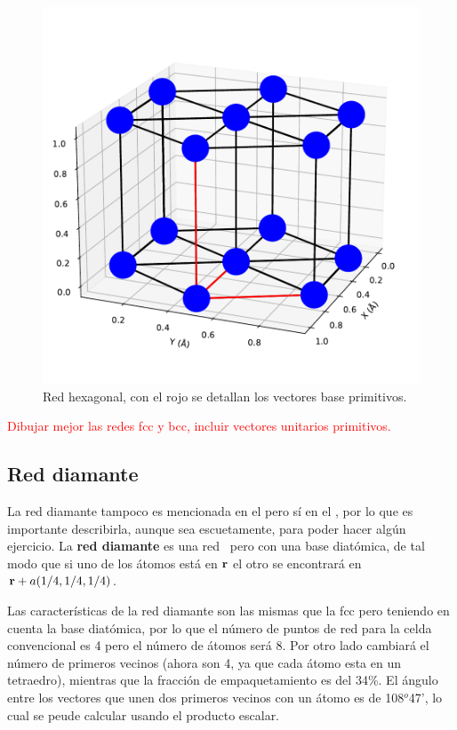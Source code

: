 \begin{figure}[h!] \centering
	\includegraphics[scale=0.4]{Imagenes/1.pdf}
	\caption{Red hexagonal, con el rojo se detallan los vectores base primitivos.}
	\label{Fig:01-051}
\end{figure}

\begin{Anotacion}
	\textcolor{red}{
	Dibujar mejor las redes fcc y bcc, incluir vectores unitarios primitivos.}
\end{Anotacion}

\subsection{Red diamante}

La red diamante tampoco es mencionada en el \cite{Fisica_del_Estado_Solido} pero sí en el \cite{Fisica_del_Estado_Solido_Resueltos}, por lo que es importante describirla, aunque sea escuetamente, para poder hacer algún ejercicio. La \textbf{red diamante} es una red \fcc \ pero con una base diatómica, de tal modo que si uno de los átomos está en $\mathbf{r}$ el otro se encontrará en $\mathbf{r}+a(1/4,1/4,1/4)$. 

Las características de la red diamante son las mismas que la fcc pero teniendo en cuenta la base diatómica, por lo que el número de puntos de red para la celda convencional es 4 pero el número de átomos será 8. Por otro lado cambiará el número de primeros vecinos (ahora son 4, ya que cada átomo esta en un tetraedro), mientras que la fracción de empaquetamiento es del 34\%. El ángulo entre los vectores que unen dos primeros vecinos con un átomo es de 108$^o$47', lo cual se peude calcular usando el producto escalar.


